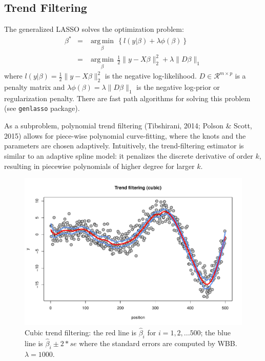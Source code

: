 \documentclass[12pt]{TD-CJS}
\newcommand{\R}{\mathcal{R}}
\DeclareMathOperator*{\argmin}{arg\,min}
\begin{document}
\subsection{Trend Filtering}
The generalized LASSO solves the optimization problem:
\begin{eqnarray*}
\beta^* &=& \underset{\beta}{\argmin} \, \left\{ l(y|\beta) + \lambda\phi(\beta)  \right\}\\
&=& \underset{\beta}{\argmin} \, \frac{1}{2}\|y - X\beta\|_2^2 + \lambda \|D\beta\|_1
\end{eqnarray*}
where $ l(y|\beta) = \frac{1}{2}\|y - X\beta\|_2^2 $ is the negative log-likelihood. $D \in \R^{m\times p}$ is a penalty matrix and $ \lambda\phi(\beta) = \lambda \|D\beta\|_1$ is the negative log-prior or regularization penalty. There are fast path algorithms for solving this problem (see {\tt genlasso} package).

As a subproblem, polynomial trend filtering (Tibshirani, 2014; Polson \& Scott, 2015) allows for piece-wise polynomial curve-fitting, where the knots and the parameters are chosen adaptively. Intuitively, the trend-filtering estimator is similar to an adaptive spline model: it penalizes the discrete derivative of order $k$, resulting in piecewise polynomials of higher degree for larger $k$.

\begin{figure}[ht]
\centering 
\includegraphics[scale=0.55]{filtering.pdf} 
\caption{Cubic trend filtering: the red line is $\hat\beta_i$ for $i=1,2,...500$; the blue line is $\hat\beta_i \pm 2*se$ where the standard errors are computed by WBB. $\lambda = 1000$.}
\label{filter}
\end{figure}
\end{document}
